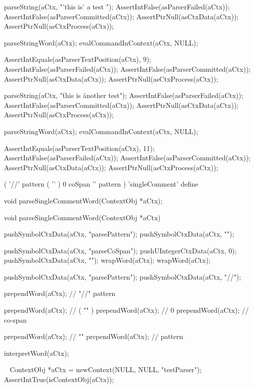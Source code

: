 \startCTest
  parseString(aCtx, "'this is' a test ");
  AssertIntFalse(asParserFailed(aCtx));
  AssertIntFalse(asParserCommitted(aCtx));
  AssertPtrNull(asCtxData(aCtx));
  AssertPtrNull(asCtxProcess(aCtx));
  
  parseStringWord(aCtx);
  evalCommandInContext(aCtx, NULL);
  
  AssertIntEquals(asParserTextPosition(aCtx), 9);
  AssertIntFalse(asParserFailed(aCtx));
  AssertIntFalse(asParserCommitted(aCtx));
  AssertPtrNull(asCtxData(aCtx));
  AssertPtrNull(asCtxProcess(aCtx));
  
  parseString(aCtx, "\" this is \" another test");
  AssertIntFalse(asParserFailed(aCtx));
  AssertIntFalse(asParserCommitted(aCtx));
  AssertPtrNull(asCtxData(aCtx));
  AssertPtrNull(asCtxProcess(aCtx));
  
  parseStringWord(aCtx);
  evalCommandInContext(aCtx, NULL);
  
  AssertIntEquals(asParserTextPosition(aCtx), 11);
  AssertIntFalse(asParserFailed(aCtx));
  AssertIntFalse(asParserCommitted(aCtx));
  AssertPtrNull(asCtxData(aCtx));
  AssertPtrNull(asCtxProcess(aCtx));
\stopCTest
\stopTestCase
\stopTestSuite

\startTestSuite[parseSingleCommentWord]

\starttyping
(
  '//' pattern
  ( '\n' ) 0 coSpan
  '\n' pattern
) 'singleComment' define
\stoptyping

\startCHeader
void parseSingleCommentWord(ContextObj *aCtx);
\stopCHeader

\startCCode
void parseSingleCommentWord(ContextObj *aCtx) {

  pushSymbolCtxData(aCtx, "parsePattern");
  pushSymbolCtxData(aCtx, "\n");
  
  pushSymbolCtxData(aCtx, "parseCoSpan");
  pushUIntegerCtxData(aCtx, 0);
  pushSymbolCtxData(aCtx, "\n");
  wrapWord(aCtx);
  wrapWord(aCtx);
  
  pushSymbolCtxData(aCtx, "parsePattern");
  pushSymbolCtxData(aCtx, "//");
  
  prependWord(aCtx); // "//" pattern
  
  prependWord(aCtx); // ( "\n" )
  prependWord(aCtx); // 0
  prependWord(aCtx); // co-span
  
  prependWord(aCtx); // "\n"
  prependWord(aCtx); // pattern
  
  interpretWord(aCtx);
}
\stopCCode

\CTestsSuiteSetup\
\startCTest
  ContextObj *aCtx = newContext(NULL, NULL, "testParser");
  AssertIntTrue(isContextObj(aCtx));
  
